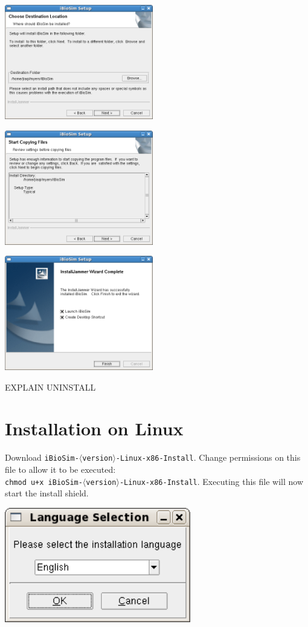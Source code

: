 \documentclass[titlepage,11pt]{article}
\begin{document}
\includegraphics[height=50mm]{screenshots/location}

\includegraphics[height=50mm]{screenshots/confirm}

\includegraphics[height=50mm]{screenshots/finish}

EXPLAIN UNINSTALL

\section{Installation on Linux}

\noindent
Download {\tt iBioSim-$\langle$version$\rangle$-Linux-x86-Install}.
Change permissions on this file to allow it to be executed:\\
{\tt chmod u+x iBioSim-$\langle$version$\rangle$-Linux-x86-Install}.
Executing this file will now start the install shield.

\includegraphics[height=50mm]{screenshots/language}
\end{document}
